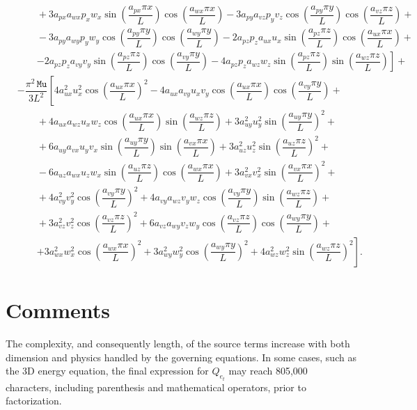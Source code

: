 \documentclass[10pt]{article}
\newcommand{\MU}{\,\mathtt{Mu}}
\begin{document}
\begin{equation}
\begin{split}
    &\qquad+3 a_{px} a_{wx} p_x w_x \sin\left(\dfrac{a_{px} \pi x}{L}\right) \cos\left(\dfrac{a_{wx} \pi x}{L}\right)-3 a_{py} a_{vz} p_y v_z \cos\left(\dfrac{a_{py} \pi y}{L}\right) \cos\left(\dfrac{a_{vz} \pi z}{L}\right)+\\
    &\qquad-3 a_{py} a_{wy} p_y w_y \cos\left(\dfrac{a_{py} \pi y}{L}\right) \cos\left(\dfrac{a_{wy} \pi y}{L}\right)-2 a_{pz} p_z a_{ux} u_x \sin\left(\dfrac{a_{pz} \pi z}{L}\right) \cos\left(\dfrac{a_{ux} \pi x}{L}\right)+\\
    &\qquad\left. -2 a_{pz} p_z a_{vy} v_y \sin\left(\dfrac{a_{pz} \pi z}{L}\right) \cos\left(\dfrac{a_{vy} \pi y}{L}\right)-4 a_{pz} p_z a_{wz} w_z \sin\left(\dfrac{a_{pz} \pi z}{L}\right) \sin\left(\dfrac{a_{wz} \pi z}{L}\right)\right]+\\
%
&- \dfrac{ \pi^2 \MU }{3L^2}\left[4 a_{ux}^2 u_x^2 \cos\left(\dfrac{a_{ux} \pi x}{L}\right)^2-4 a_{ux} a_{vy} u_x v_y \cos\left(\dfrac{a_{ux} \pi x}{L}\right) \cos\left(\dfrac{a_{vy} \pi y}{L}\right)+\right.\\
    &\qquad+4 a_{ux} a_{wz} u_x w_z \cos\left(\dfrac{a_{ux} \pi x}{L}\right) \sin\left(\dfrac{a_{wz} \pi z}{L}\right)+3 a_{uy}^2 u_y^2 \sin\left(\dfrac{a_{uy} \pi y}{L}\right)^2+\\
    &\qquad+6 a_{uy} a_{vx} u_y v_x \sin\left(\dfrac{a_{uy} \pi y}{L}\right) \sin\left(\dfrac{a_{vx} \pi x}{L}\right)+3 a_{uz}^2 u_z^2 \sin\left(\dfrac{a_{uz} \pi z}{L}\right)^2+\\
    &\qquad-6 a_{uz} a_{wx} u_z w_x \sin\left(\dfrac{a_{uz} \pi z}{L}\right) \cos\left(\dfrac{a_{wx} \pi x}{L}\right)+3 a_{vx}^2 v_x^2 \sin\left(\dfrac{a_{vx} \pi x}{L}\right)^2+\\
    &\qquad+4 a_{vy}^2 v_y^2 \cos\left(\dfrac{a_{vy} \pi y}{L}\right)^2+4 a_{vy} a_{wz} v_y w_z \cos\left(\dfrac{a_{vy} \pi y}{L}\right) \sin\left(\dfrac{a_{wz} \pi z}{L}\right)+\\
    &\qquad+3 a_{vz}^2 v_z^2 \cos\left(\dfrac{a_{vz} \pi z}{L}\right)^2+6 a_{vz} a_{wy} v_z w_y \cos\left(\dfrac{a_{vz} \pi z}{L}\right) \cos\left(\dfrac{a_{wy} \pi y}{L}\right)+\\
    &\qquad\left.+3 a_{wx}^2 w_x^2 \cos\left(\dfrac{a_{wx} \pi x}{L}\right)^2+3 a_{wy}^2 w_y^2 \cos\left(\dfrac{a_{wy} \pi y}{L}\right)^2+4 a_{wz}^2 w_z^2 \sin\left(\dfrac{a_{wz} \pi z}{L}\right)^2\right] .
\end{split}
\end{equation}



\section{Comments}
The complexity, and consequently length, of the source terms increase with both dimension and physics handled by the governing equations. In some cases, such as the 3D energy equation, the final expression for $Q_{e_t}$ may reach 805,000 characters, including parenthesis and mathematical operators, prior to factorization.
\end{document}
